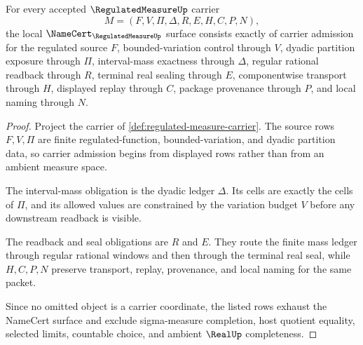 \begin{theorem}
\label{thm:regulated-measure-namecert-obligations}
For every accepted $\RegulatedMeasureUp$ carrier
$$
M=(F,V,\Pi,\Delta,R,E,H,C,P,N),
$$
the local $\NameCert_{\RegulatedMeasureUp}$ surface consists exactly of carrier admission for the regulated source $F$, bounded-variation control through $V$, dyadic partition exposure through $\Pi$, interval-mass exactness through $\Delta$, regular rational readback through $R$, terminal real sealing through $E$, componentwise transport through $H$, displayed replay through $C$, package provenance through $P$, and local naming through $N$.
\end{theorem}
\begin{proof}
Project the carrier of \autoref{def:regulated-measure-carrier}. The source rows $F,V,\Pi$ are finite regulated-function, bounded-variation, and dyadic partition data, so carrier admission begins from displayed rows rather than from an ambient measure space.

The interval-mass obligation is the dyadic ledger $\Delta$. Its cells are exactly the cells of $\Pi$, and its allowed values are constrained by the variation budget $V$ before any downstream readback is visible.

The readback and seal obligations are $R$ and $E$. They route the finite mass ledger through regular rational windows and then through the terminal real seal, while $H,C,P,N$ preserve transport, replay, provenance, and local naming for the same packet.

Since no omitted object is a carrier coordinate, the listed rows exhaust the NameCert surface and exclude sigma-measure completion, host quotient equality, selected limits, countable choice, and ambient $\RealUp$ completeness.
\end{proof}

